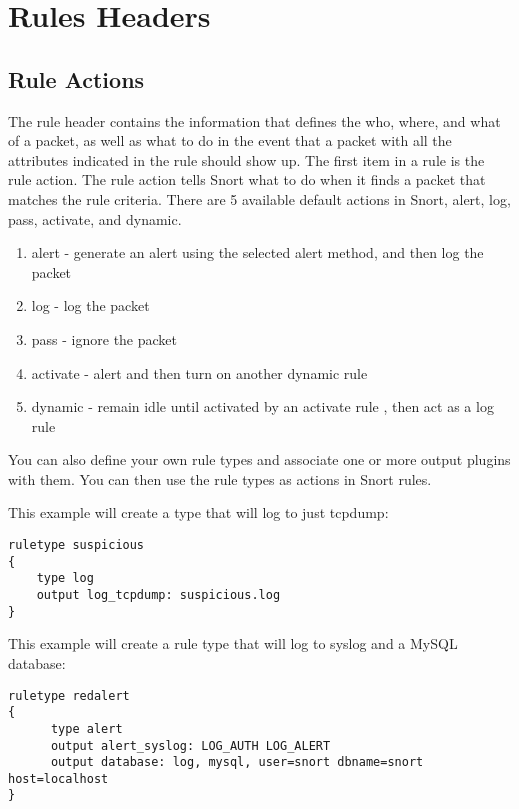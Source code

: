 \documentclass[english]{report}
\begin{document}
\section{Rules Headers}


\subsection{Rule Actions \label{rules action section}}

The rule header contains the information that defines the who,
where, and what of a packet, as well as what to do in the
event that a packet with all the attributes indicated in the rule
should show up. The first item in a rule is the rule action. The rule
action tells Snort what to do when it finds a packet that matches
the rule criteria. There are 5 available default actions in Snort,
alert, log, pass, activate, and dynamic. 

\begin{enumerate}
\item alert - generate an alert using the selected alert method, and then
log the packet 
\item log - log the packet 
\item pass - ignore the packet 
\item activate - alert and then turn on another dynamic rule  
\item dynamic - remain idle until activated by an activate rule , then act
as a log rule
\end{enumerate}
You can also define your own rule types and associate one or more
output plugins with them. You can then use the rule types as actions
in Snort rules.

This example will create a type that will log to just tcpdump:

\begin{verbatim}
ruletype suspicious
{
    type log 
    output log_tcpdump: suspicious.log
}
\end{verbatim}

This example will create a rule type that will log to syslog and a
MySQL database:

\begin{center}
\begin{verbatim}
ruletype redalert
{
      type alert 
      output alert_syslog: LOG_AUTH LOG_ALERT 
      output database: log, mysql, user=snort dbname=snort host=localhost 
}
\end{verbatim}
\end{center}
\end{document}
